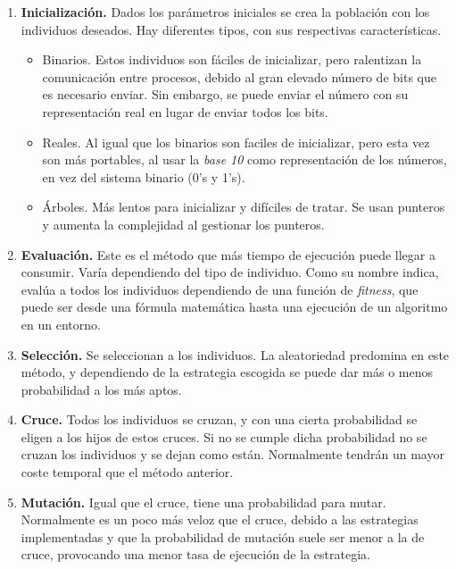 	\begin{enumerate}
		\item \textbf{Inicialización.} Dados los parámetros iniciales se crea la población con los individuos deseados. Hay diferentes tipos, con sus respectivas características.
		\begin{itemize}
			\item Binarios. Estos individuos son fáciles de inicializar, pero ralentizan la comunicación entre procesos, debido al gran elevado número de bits que es necesario enviar. Sin embargo, se puede enviar el número con su representación real en lugar de enviar todos los bits.
			\item Reales. Al igual que los binarios son faciles de inicializar, pero esta vez son más portables, al usar la \textit{base 10} como representación de los números, en vez del sistema binario (0's y 1's). 
			\item Árboles. Más lentos para inicializar y difíciles de tratar. Se usan punteros y aumenta la complejidad al gestionar los punteros.
		\end{itemize}
		
		\item \textbf{Evaluación.} Este es el método que más tiempo de ejecución puede llegar a consumir. Varía dependiendo del tipo de individuo. Como su nombre indica, evalúa a todos los individuos dependiendo de una función de \textit{fitness}, que puede ser desde una fórmula matemática hasta una ejecución de un algoritmo en un entorno.
		
		\item \textbf{Selección.} Se seleccionan a los individuos. La aleatoriedad predomina en este método, y dependiendo de la estrategia escogida se puede dar más o menos probabilidad a los más aptos. 
		
		\item \textbf{Cruce.} Todos los individuos se cruzan, y con una cierta probabilidad se eligen a los hijos de estos cruces. Si no se cumple dicha probabilidad no se cruzan los individuos y se dejan como están. Normalmente tendrán un mayor coste temporal que el método anterior.
		
		\item \textbf{Mutación.} Igual que el cruce, tiene una probabilidad para mutar. Normalmente es un poco más veloz que el cruce, debido a las estrategias implementadas y que la probabilidad de mutación suele ser menor a la de cruce, provocando una menor tasa de ejecución de la estrategia.
	\end{enumerate}
	

